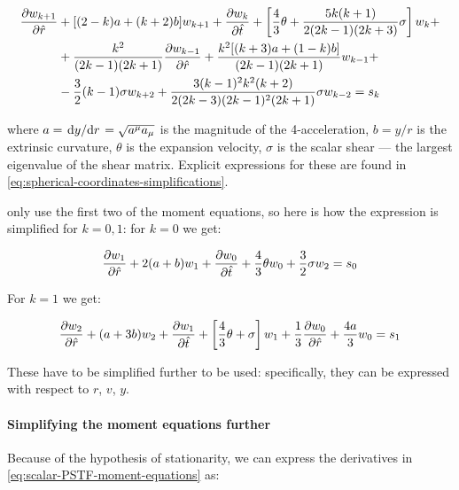 \documentclass[main.tex]{subfiles}
\begin{document}
\begin{equation} \label{eq:scalar-PSTF-moment-equations}
  \begin{split}
    \pdv{w_{k+1}}{\hat{r}} &+[(2-k) a+(k+2) b] w_{k+1}+\pdv{w_k}{\hat{t}}+\left[\frac{4}{3} \theta+\frac{5 k(k+1)}{2(2 k-1)(2 k+3)} \sigma\right] w_{k} + \\
    &+\frac{k^{2}}{(2 k-1)(2 k+1)} \pdv{w_{k-1}}{\hat{r}}+\frac{k^{2}[(k+3) a+(1-k) b]}{(2 k-1)(2 k+1)} w_{k-1} +  \\
    &-\frac{3}{2}(k-1) \sigma w_{k+2}+\frac{3(k-1)^{2} k^{2}(k+2)}{2(2 k-3)(2 k-1)^{2}(2 k+1)} \sigma w_{k-2} = s_k
    \end{split}
\end{equation}

where \(a = \dv*{y}{r} = \sqrt{a^\mu a_\mu}\) is the magnitude of the 4-acceleration, \(b = y/r\) is the extrinsic curvature, \(\theta\) is the expansion velocity, \(\sigma\) is the scalar shear --- the largest eigenvalue of the shear matrix. Explicit expressions for these are found in  \eqref{eq:spherical-coordinates-simplifications}.

\textcite[]{NobiliTurollaZampieri:1991dec} only use the first two of the moment equations, so here is how the expression is simplified for \(k=0,1\):
for \(k=0\) we get:

\begin{equation}
    \pdv{w_{1}}{\hat{r}} +2( a+ b) w_{1}+\pdv{w_0}{\hat{t}}+\frac{4}{3} \theta w_{0} + \frac{3}{2} \sigma w_{2} = s_0
\end{equation}

For \(k=1\) we get:

\begin{equation}
    \pdv{w_{2}}{\hat{r}} + (a+3 b) w_{2}+\pdv{w_1}{\hat{t}}+\left[\frac{4}{3} \theta+ \sigma\right] w_{1} +\frac{1}{3} \pdv{w_{0}}{\hat{r}}+\frac{4 a}{3} w_{0} = s_1
\end{equation}

These have to be simplified further to be used: specifically, they can be expressed with respect to \(r\), \(v\), \(y\).

\paragraph{Simplifying the moment equations further}


Because of the hypothesis of stationarity, we can express the derivatives in \eqref{eq:scalar-PSTF-moment-equations} as:
\end{document}
